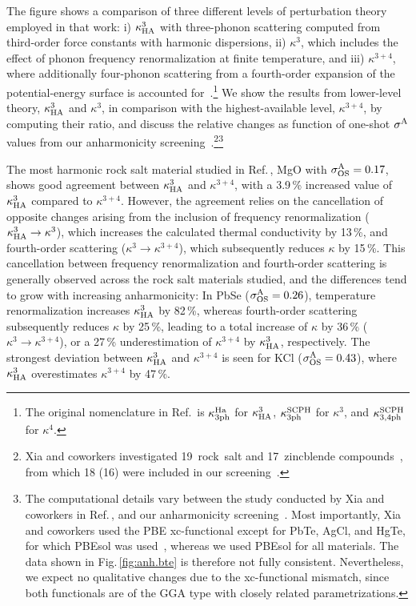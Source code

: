 The figure shows a comparison of three different levels of perturbation theory employed in that work: i) $\kappa^3_{\rm HA}$ with three-phonon scattering computed from third-order force constants with harmonic dispersions, ii) $\kappa^3$, which includes the effect of phonon frequency renormalization at finite temperature, and iii) $\kappa^{3+4}$, where additionally four-phonon scattering from a fourth-order expansion of the potential-energy surface is accounted for~\cite{Feng.2016, Xia.2018}.\footnote{The original nomenclature in Ref.\,\cite{Xia.2020} is $\kappa^{\rm Ha}_{\rm 3ph}$ for $\kappa^3_{\rm HA}$, $\kappa^{\rm SCPH}_{\rm 3ph}$ for $\kappa^3$, and $\kappa^{\rm SCPH}_{\rm 3,4ph}$ for $\kappa^4$.}
 We show the results from lower-level theory, $\kappa^3_{\rm HA}$ and $\kappa^3$, in comparison with the highest-available level, $\kappa^{3+4}$, by computing their ratio, and discuss the relative changes as function of one-shot $\sigma^\mathrm{A}$ values from our anharmonicity screening~\cite{Knoop.2020}.\footnote{Xia and coworkers investigated 19~rock~salt and 17~zincblende compounds~\cite{Xia.2020}, from which 18 (16) were included in our screening~\cite{Knoop.2020}.}\footnote{The computational details vary between the study conducted by Xia and coworkers in Ref.\,\cite{Xia.2020}, and our anharmonicity screening~\cite{Knoop.2020}. Most importantly, Xia and coworkers used the PBE xc-functional except for PbTe, AgCl, and HgTe, for which PBEsol was used~\cite{Perdew.1996,Perdew.2008}, whereas we used PBEsol for all materials. The data shown in Fig.\,\ref{fig:anh.bte} is therefore not fully consistent. Nevertheless, we expect no qualitative changes due to the xc-functional mismatch, since both functionals are of the GGA type with closely related parametrizations.}

The most harmonic rock salt material studied in Ref.\,\cite{Xia.2020}, MgO with $\sigma^\mathrm{A}_\mathrm{OS} = 0.17$, shows good agreement between $\kappa^3_{\rm HA}$ and $\kappa^{3+4}$, with a 3.9\,\% increased value of $\kappa^3_{\rm HA}$ compared to $\kappa^{3+4}$. However, the agreement relies on the cancellation of opposite changes arising from the inclusion of frequency renormalization ($\kappa^3_{\rm HA} \to \kappa^3$), which increases the calculated thermal conductivity by 13\,\%, and fourth-order scattering ($\kappa^3 \to \kappa^{3+4}$), which subsequently reduces $\kappa$ by 15\,\%. This cancellation between frequency renormalization and fourth-order scattering is generally observed across the rock salt materials studied, and the differences tend to grow with increasing anharmonicity: In PbSe ($\sigma^\mathrm{A}_\mathrm{OS} = 0.26$), temperature renormalization increases $\kappa^3_{\rm HA}$ by 82\,\%, whereas fourth-order scattering subsequently reduces $\kappa$ by 25\,\%, leading to a total increase of $\kappa$ by 36\,\% ($\kappa^3 \to \kappa^{3+4}$), or a 27\,\% underestimation of $\kappa^{3+4}$ by $\kappa^3_{\rm HA}$, respectively. The strongest deviation between $\kappa^3_{\rm HA}$ and $\kappa^{3+4}$ is seen for KCl ($\sigma^\mathrm{A}_\mathrm{OS} = 0.43$), where $\kappa^3_{\rm HA}$ overestimates $\kappa^{3+4}$ by 47\,\%.


